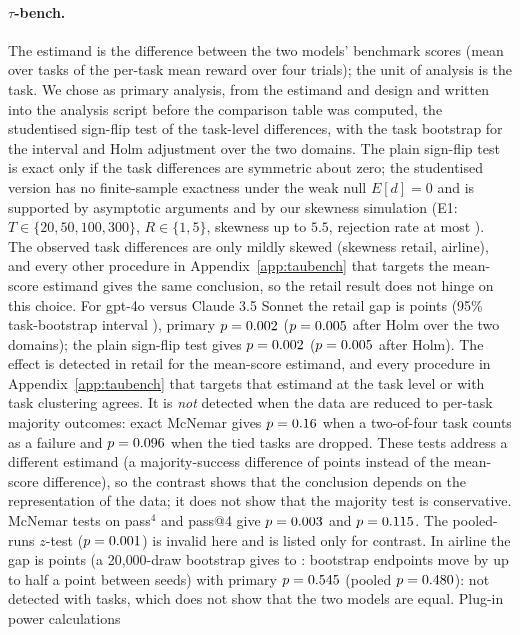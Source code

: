 \begin{table}[tbp]
\centering\footnotesize
\caption{SWE-bench Verified sensitivity analysis. ``Adjacent'' counts distinguishable neighbouring leaderboard positions; Holm is applied over all pairs of the subset.}\label{tab:swerobust}

\end{table}

\paragraph{$\tau$-bench.} The estimand is the difference between the two models' benchmark scores (mean over tasks of the per-task mean reward over four trials); the unit of analysis is the task. We chose as primary analysis, from the estimand and design and written into the analysis script before the comparison table was computed, the studentised sign-flip test of the task-level differences, with the task bootstrap for the interval and Holm adjustment over the two domains. The plain sign-flip test is exact only if the task differences are symmetric about zero; the studentised version has no finite-sample exactness under the weak null $E[d]=0$ and is supported by asymptotic arguments and by our skewness simulation (E1: $T\in\{20,50,100,300\}$, $R\in\{1,5\}$, skewness up to $5.5$, rejection rate at most \asymMaxSSF{}). The observed task differences are only mildly skewed (skewness \tauRetailSkew{} retail, \tauAirlineSkew{} airline), and every other procedure in Appendix~\ref{app:taubench} that targets the mean-score estimand gives the same conclusion, so the retail result does not hinge on this choice. For gpt-4o versus Claude 3.5 Sonnet the retail gap is \tauRetailDiff{} points (95\% task-bootstrap interval \tauRetailCI), primary $p=0.002$ ($p=0.005$ after Holm over the two domains); the plain sign-flip test gives $p=0.002$ ($p=0.005$ after Holm). The effect is detected in retail for the mean-score estimand, and every procedure in Appendix~\ref{app:taubench} that targets that estimand at the task level or with task clustering agrees. It is \emph{not} detected when the data are reduced to per-task majority outcomes: exact McNemar gives $p=0.16$ when a two-of-four task counts as a failure and $p=0.096$ when the \tauRetailNTies{} tied tasks are dropped. These tests address a different estimand (a majority-success difference of \tauRetailMajEst{} points instead of the mean-score difference), so the contrast shows that the conclusion depends on the representation of the data; it does not show that the majority test is conservative. McNemar tests on pass$^4$ and pass@4 give $p=0.003$ and $p=0.115$. The pooled-runs $z$-test ($p=0.001$) is invalid here and is listed only for contrast. In airline the gap is \tauAirlineDiff{} points \tauAirlineCI{} (a 20{,}000-draw bootstrap gives \tauAirlineBootLo{} to \tauAirlineBootHi{}: bootstrap endpoints move by up to half a point between seeds) with primary $p=0.545$ (pooled $p=0.480$): not detected with \tauAirlineTasks{} tasks, which does not show that the two models are equal. Plug-in power calculations 